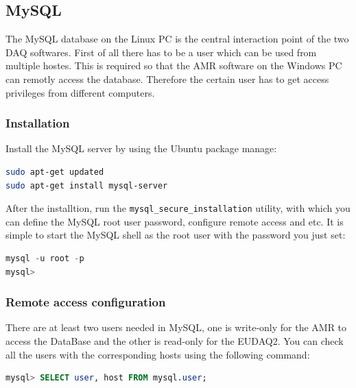 \documentclass[a4paper,12pt]{scrartcl}
\begin{document}
\subsection{MySQL}
The MySQL database on the Linux PC is the central interaction point of the two DAQ softwares. First of all there has to be a user which can be used from multiple hostes. This is required so that the AMR software on the Windows PC can remotly access the database. Therefore the certain user has to get access privileges from different computers.

\subsubsection*{Installation}

Install the MySQL server by using the Ubuntu package manage:
\begin{lstlisting}[language=bash]
sudo apt-get updated
sudo apt-get install mysql-server
\end{lstlisting}

After the installtion, run the \verb|mysql_secure_installation| utility, with which you can define the MySQL root user password, configure remote access and etc.
It is simple to start the MySQL shell as the root user with the password you just set:
\begin{lstlisting}[language=SQL]
mysql -u root -p
mysql>
\end{lstlisting}

\subsubsection*{Remote access configuration}
There are at least two users needed in MySQL, one is write-only for the AMR to access the DataBase and the other is read-only for the EUDAQ2.
You can check all the users with the corresponding hosts using the following command:
\begin{lstlisting}[language=SQL]
mysql> SELECT user, host FROM mysql.user;
\end{lstlisting}
\end{document}
